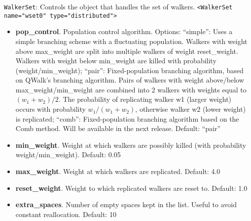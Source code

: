 \texttt{WalkerSet}: Controls the object that handles the set of walkers.
\texttt{<WalkerSet name="wset0" type="distributed">}
\begin{itemize}
\item \textbf{pop\_control}. Population control algorithm. Options: ``simple'': Uses a simple branching scheme with a fluctuating population. Walkers with weight above max\_weight are split into multiple walkers of weight reset\_weight. Walkers with weight below min\_weight are killed with probability (weight/min\_weight); ``pair'': Fixed-population branching algorithm, based on QWalk's branching algorithm. Pairs of walkers with weight above/below max\_weight/min\_weight are combined into 2 walkers with weights equal to $(w_1+w_2)/2$. The probability of replicating walker w1 (larger weight) occurs with probability $w_1/(w_1+w_2)$, otherwise walker w2 (lower weight) is replicated; ``comb'': Fixed-population branching algorithm based on the Comb method. Will be available in the next release. Default: ``pair''
\item \textbf{min\_weight}. Weight at which walkers are possibly killed (with probability weight/min\_weight). Default: 0.05
\item \textbf{max\_weight}. Weight at which walkers are replicated. Default: 4.0
\item \textbf{reset\_weight}. Weight to which replicated walkers are reset to. Default: 1.0
\item \textbf{extra\_spaces}. Number of empty spaces kept in the list. Useful to avoid constant reallocation. Default: 10 \\
\end{itemize}

